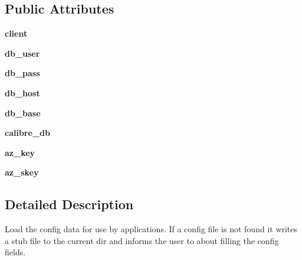 \subsection*{Public Attributes}
\begin{DoxyCompactItemize}
\item 
\hypertarget{classgconf__config_1_1gconf__config_aa5f815e13c388813bb0b74dd00776f2a}{
{\bfseries client}}
\label{classgconf__config_1_1gconf__config_aa5f815e13c388813bb0b74dd00776f2a}

\item 
\hypertarget{classgconf__config_1_1gconf__config_a0c5c1e17033c2243b37e467a93b53fdd}{
{\bfseries db\_\-user}}
\label{classgconf__config_1_1gconf__config_a0c5c1e17033c2243b37e467a93b53fdd}

\item 
\hypertarget{classgconf__config_1_1gconf__config_ab7f53a5a8e361118ce7302025989cb9c}{
{\bfseries db\_\-pass}}
\label{classgconf__config_1_1gconf__config_ab7f53a5a8e361118ce7302025989cb9c}

\item 
\hypertarget{classgconf__config_1_1gconf__config_a8eba3306d02e4828b4bda678af0feeee}{
{\bfseries db\_\-host}}
\label{classgconf__config_1_1gconf__config_a8eba3306d02e4828b4bda678af0feeee}

\item 
\hypertarget{classgconf__config_1_1gconf__config_af7def5bc7548378918225c4b0d25b325}{
{\bfseries db\_\-base}}
\label{classgconf__config_1_1gconf__config_af7def5bc7548378918225c4b0d25b325}

\item 
\hypertarget{classgconf__config_1_1gconf__config_ab66a30ab1df23b4463f06c3a946f9d92}{
{\bfseries calibre\_\-db}}
\label{classgconf__config_1_1gconf__config_ab66a30ab1df23b4463f06c3a946f9d92}

\item 
\hypertarget{classgconf__config_1_1gconf__config_af6a3db763fdcd7638179d5d74d1e0e63}{
{\bfseries az\_\-key}}
\label{classgconf__config_1_1gconf__config_af6a3db763fdcd7638179d5d74d1e0e63}

\item 
\hypertarget{classgconf__config_1_1gconf__config_a227eeafde653a119cf9f9f8c28be6df5}{
{\bfseries az\_\-skey}}
\label{classgconf__config_1_1gconf__config_a227eeafde653a119cf9f9f8c28be6df5}

\end{DoxyCompactItemize}


\subsection{Detailed Description}
\begin{DoxyVerb}Load the config data for use by applications.
If a config file is not found it writes a stub file to the current dir
and informs the user to about filling the config fields.\end{DoxyVerb}
 

